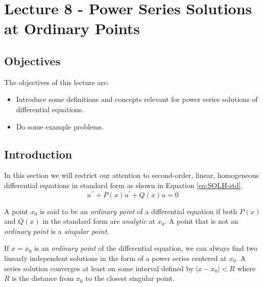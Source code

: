 \chapter{Lecture 8 - Power Series Solutions at Ordinary Points}
\label{ch:lec8}
\section{Objectives}
The objectives of this lecture are:
\begin{itemize}
\item Introduce some definitions and concepts relevant for power series solutions of differential equations.
\item Do some example problems.
\end{itemize}

\section{Introduction}
In this section we will restrict our attention to second-order, linear, homogeneous differential equations in standard form as shown in Equation \ref{eq:SOLH-std}.
\begin{equation}
u^{\prime \prime}+P(x)u^{\prime}+Q(x)u=0
\label{eq:SOLH-std}
\end{equation}

 
\begin{definition}
A point $x_0$ is said to be an \emph{ordinary point} of a differential equation if both $P(x)$ and $Q(x)$ in the standard form are \emph{analytic} at $x_0$.  A point that is not an \emph{ordinary point} is a \emph{singular point}.
\end{definition}


\begin{theorem}
If $x=x_0$ is an \emph{ordinary point} of the differential equation, we can always find two linearly independent solutions in the form of a power series centered at $x_0$.  A series solution converges at least on some interval defined by $\left| x - x_0 \right|<R$ where $R$ is the distance from $x_0$ to the closest singular point.
\label{thm:existence-of-power-series-solutions}
\end{theorem}

